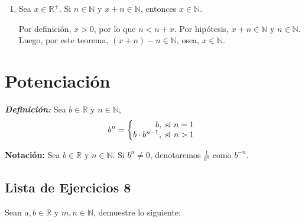 \documentclass[11pt]{article}
\newcommand{\N}{\mathbb{N}}
\newcommand{\R}{\mathbb{R}}
\newcommand{\bfit}[1]{\textbf{\textit{#1}}}
\begin{document}
\begin{enumerate}[label=\alph*)]
\begin{enumerate}[label=\roman*)]
        \item Sea $x\in \R^+$. Si $n\in \N$ y $x+n\in \N$, entonces $x\in \N$.

        Por definición, $x>0$, por lo que $n<n+x$. Por hipótesis, $x+n\in \N$ y $n\in \N$. Luego, por este teorema, $(x+n)-n \in \N$, osea, $x\in \N$.
    \end{enumerate} %

\end{enumerate}

\section*{Potenciación}

\bfit{Definición:}  Sea $b\in \R$ y $n\in \N$,
    \[
        b^n = \left\{
    \begin{array}{@{}r@{\thinspace}l}
        b, &  \ \text{si}  \ n = 1\\
        b\cdot b^{n-1}, &  \ \text{si}  \ n > 1
    \end{array} \right. \]

\textbf{Notación:} Sea $b\in \R$ y $n\in \N$. Si $b^n \neq 0$, denotaremos $\frac{1}{b^n}$ como $b^{-n}$.

\subsection*{Lista de Ejercicios 8}

Sean $a, b\in \R$ y $m,n\in \N$, demuestre lo siguiente:
\end{document}
